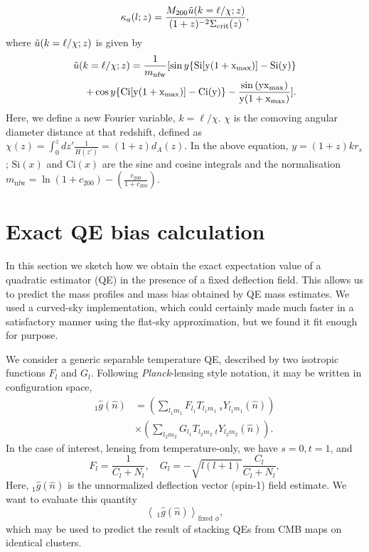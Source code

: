 \documentclass[prd, superscriptaddress, tightenlines, longbibliography, nofootinbib, eqsecnum, amsfonts, amsmath, floatfix, twocolumn, notitlepage]{revtex4-2}
\newcommand{\av}[1]{\left \langle #1\right\rangle}
\begin{document}
\begin{equation}\label{eq:ft_anal1}
    \kappa_{a}(l;z) = \frac{M_{200}\Tilde{u}(k=\ell/\chi;z)}{(1+z)^{-2}\Sigma_{\text{crit}}(z)},
\end{equation}
where $\Tilde{u}(k=\ell/\chi;z)$ is given by
\begin{equation}\label{eq:ft_anal2}
	  \begin{split}
    \Tilde{u}(k=\ell/\chi;z) = \frac{1}{m_{\text{nfw}}}[\sin{y}\{\text{Si}[y(1+x_{\text{max}})] -\text{Si}(y)\} \\
    +\cos{y}\{ \text{Ci}[y(1+x_{\text{max}})]-\text{Ci}(y) \} - \frac{\sin{(y x_{\text{max}})}}{y(1+x_{\text{max}})}].
      \end{split}
\end{equation}
Here, we define a new Fourier variable, $k =\ell/\chi$. $\chi$ is the comoving angular diameter distance at that redshift, defined as $\chi(z) = \int_0^z dz'\frac{1}{H(z')} = (1+z)d_A(z)$. In the above equation, $y = (1+z)kr_s$; $\text{Si}(x)$ and $\text{Ci}(x)$ are the sine and cosine integrals and the normalisation $m_{\text{nfw}} = \ln{(1+c_{200})}-\left(\frac{c_{200}}{1+c_{200}}\right)$.



\section{Exact QE bias calculation}\label{A1}
\newcommand{\hn}[0]{\hat n}
In this section we sketch how we obtain the exact expectation value of a quadratic estimator (QE) in the presence of a fixed deflection field. This allows us to predict the mass profiles and mass bias obtained by QE mass estimates. We used a curved-sky implementation, which could certainly made much faster in a satisfactory manner using the flat-sky approximation, but we found it fit enough for purpose.

We consider a generic separable temperature QE, described by two isotropic functions $F_l$ and $G_l$. Following \emph{Planck}-lensing style notation, it may be written in configuration space,
\begin{equation}
    \begin{split}
        _{1}\hat g(\hat n) &= \left( \sum_{l_1m_1} F_{l_1} T_{l_1m_1}\:_sY_{l_1m_1}(\hn) \right) \\
         & \times\left( \sum_{l_2m_2} G_{l_1} T_{l_2m_2}\:_tY_{l_2m_2}(\hn) \right) .
    \end{split}
\end{equation}
In the case of interest, lensing from temperature-only, we have $s =0, t = 1$, and
\begin{equation}
	F_l = \frac{1}{C_l + N_l}, \quad G_l = - \sqrt{l(l+ 1)}\frac{C_l}{C_l + N_l},
\end{equation}
Here, $_{1} \hat g(\hat n)$ is the unnormalized deflection vector (spin-1) field estimate. We want to evaluate this quantity
\begin{equation} \label{eq:avg}
	\av{\: _{1}\hat g(\hat n)}_{\text{fixed $\phi$}},
\end{equation}
which may be used to predict the result of stacking QEs from CMB maps on identical clusters.
\end{document}
